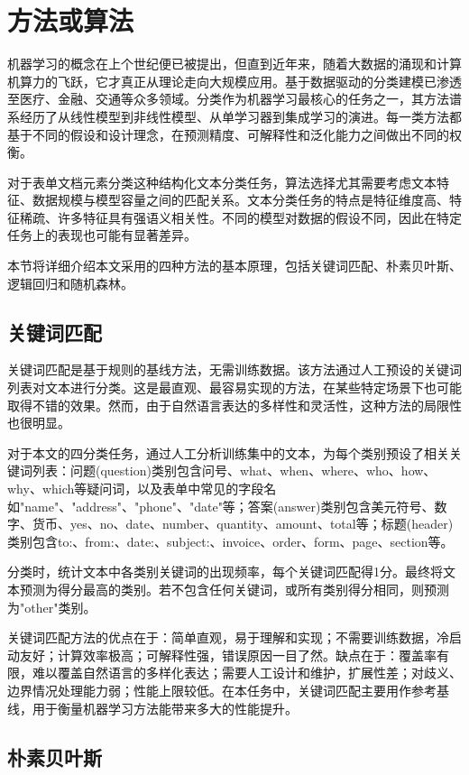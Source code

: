 \documentclass[12pt,a4paper]{article}
\begin{document}
\section{方法或算法}

机器学习的概念在上个世纪便已被提出，但直到近年来，随着大数据的涌现和计算机算力的飞跃，它才真正从理论走向大规模应用。基于数据驱动的分类建模已渗透至医疗、金融、交通等众多领域。分类作为机器学习最核心的任务之一，其方法谱系经历了从线性模型到非线性模型、从单学习器到集成学习的演进。每一类方法都基于不同的假设和设计理念，在预测精度、可解释性和泛化能力之间做出不同的权衡。

对于表单文档元素分类这种结构化文本分类任务，算法选择尤其需要考虑文本特征、数据规模与模型容量之间的匹配关系。文本分类任务的特点是特征维度高、特征稀疏、许多特征具有强语义相关性。不同的模型对数据的假设不同，因此在特定任务上的表现也可能有显著差异。

本节将详细介绍本文采用的四种方法的基本原理，包括关键词匹配、朴素贝叶斯、逻辑回归和随机森林。

\subsection{关键词匹配}

关键词匹配是基于规则的基线方法，无需训练数据。该方法通过人工预设的关键词列表对文本进行分类。这是最直观、最容易实现的方法，在某些特定场景下也可能取得不错的效果。然而，由于自然语言表达的多样性和灵活性，这种方法的局限性也很明显。

对于本文的四分类任务，通过人工分析训练集中的文本，为每个类别预设了相关关键词列表：问题(question)类别包含问号、what、when、where、who、how、why、which等疑问词，以及表单中常见的字段名如"name"、"address"、"phone"、"date"等；答案(answer)类别包含美元符号、数字、货币、yes、no、date、number、quantity、amount、total等；标题(header)类别包含to:、from:、date:、subject:、invoice、order、form、page、section等。

分类时，统计文本中各类别关键词的出现频率，每个关键词匹配得1分。最终将文本预测为得分最高的类别。若不包含任何关键词，或所有类别得分相同，则预测为"other"类别。

关键词匹配方法的优点在于：简单直观，易于理解和实现；不需要训练数据，冷启动友好；计算效率极高；可解释性强，错误原因一目了然。缺点在于：覆盖率有限，难以覆盖自然语言的多样化表达；需要人工设计和维护，扩展性差；对歧义、边界情况处理能力弱；性能上限较低。在本任务中，关键词匹配主要用作参考基线，用于衡量机器学习方法能带来多大的性能提升。

\subsection{朴素贝叶斯}
\end{document}
